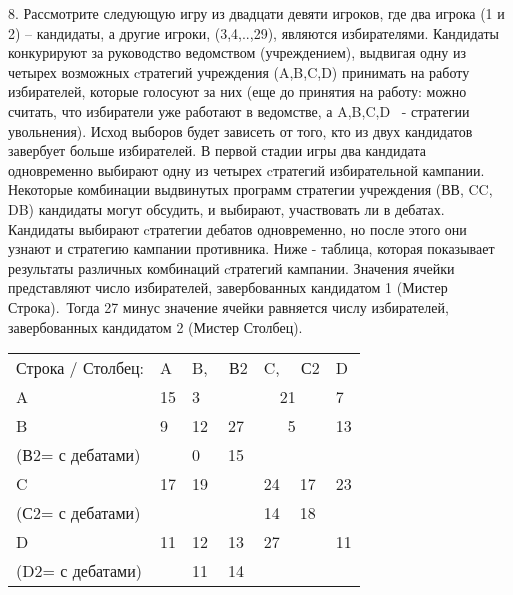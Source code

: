 \documentclass[a4paper,12pt]{article}
\begin{document}
8. Рассмотрите следующую игру из двадцати девяти
игроков, где два игрока (1 и 2) -- кандидаты, а
другие игроки, (3,4,..,29), являются избирателями.
Кандидаты конкурируют за руководство ведомством
(учреждением), выдвигая одну из четырех возможных
cтратегий учреждения (A,B,C,D) принимать на работу
избирателей, которые голосуют за них (еще до
принятия на работу: можно считать, что избиратели
уже работают в ведомстве, а A,B,C,D \ - стратегии
увольнения). Исход выборов будет зависеть от того,
кто из двух кандидатов завербует больше
избирателей. В первой стадии игры два кандидата
одновременно выбирают одну из четырех cтратегий
избирательной кампании. Некоторые комбинации
выдвинутых программ стратегии учреждения (ВВ, CC,
DB) кандидаты могут обсудить, и выбирают,
участвовать ли в дебатах. Кандидаты выбирают
cтратегии дебатов одновременно, но после этого они
узнают и стратегию кампании противника. Ниже -
таблица, которая показывает результаты различных
комбинаций cтратегий кампании. Значения ячейки
представляют число избирателей, завербованных
кандидатом 1 (Мистер Строка).\ Тогда 27 минус
значение ячейки равняется числу избирателей,
завербованных кандидатом 2 (Мистер Столбец).

\begin{tabular}{ll|ll|l|ll}
Строка / Столбец: & A &
\multicolumn{2}{l}{B, \ \ В2} &
\multicolumn{2}{l}{C, \ \ С2} & D \\ \cline{2-7} A
& \multicolumn{1}{|l|}{15} &
\multicolumn{2}{|l|}{3} & \multicolumn{2}{|l}{ \ \
21} & \multicolumn{1}{|l|}{7} \\ \cline{2-7} B &
\multicolumn{1}{|l|}{9} & 12 &
\multicolumn{1}{|l|}{27} & \multicolumn{2}{|l}{\ \
\ 5} & \multicolumn{1}{|l|}{13} \\ \cline{3-4} (В2=
с дебатами) & \multicolumn{1}{|l|}{} & 0 &
\multicolumn{1}{|l|}{15} & \multicolumn{2}{|l}{} &
\multicolumn{1}{|l|}{} \\ \cline{2-7}\cline{6-7}
C & \multicolumn{1}{|l|}{17} & 19 &  & 24 & 17 & \multicolumn{1}{|l|}{23} \\
\cline{5-6} (С2= с дебатами)
& \multicolumn{1}{|l|}{} &  &  & 14 & 18 & \multicolumn{1}{|l|}{} \\
\cline{2-7}\cline{6-7} D & \multicolumn{1}{|l|}{11}
& 12 & \multicolumn{1}{|l|}{13} &
\multicolumn{2}{|l}{27} & \multicolumn{1}{|l|}{11}
\\ \cline{3-4} (D2= с дебатами) &
\multicolumn{1}{|l|}{} & 11 &
\multicolumn{1}{|l|}{14} & \multicolumn{2}{|l}{ } &
\multicolumn{1}{|l|}{} \\ \cline{2-7}
\end{tabular}
\end{document}
